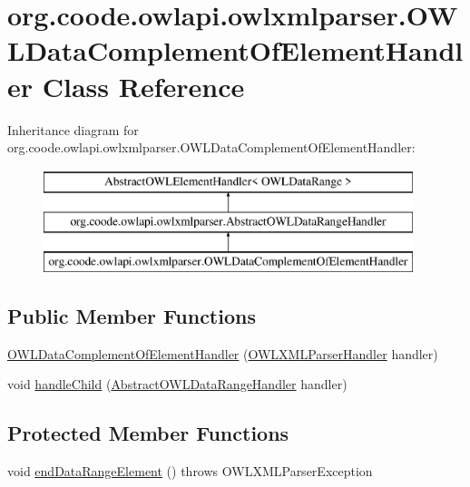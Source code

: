 \hypertarget{classorg_1_1coode_1_1owlapi_1_1owlxmlparser_1_1_o_w_l_data_complement_of_element_handler}{\section{org.\-coode.\-owlapi.\-owlxmlparser.\-O\-W\-L\-Data\-Complement\-Of\-Element\-Handler Class Reference}
\label{classorg_1_1coode_1_1owlapi_1_1owlxmlparser_1_1_o_w_l_data_complement_of_element_handler}
}
Inheritance diagram for org.\-coode.\-owlapi.\-owlxmlparser.\-O\-W\-L\-Data\-Complement\-Of\-Element\-Handler\-:\begin{figure}[H]
\begin{center}
\leavevmode
\includegraphics[height=3.000000cm]{classorg_1_1coode_1_1owlapi_1_1owlxmlparser_1_1_o_w_l_data_complement_of_element_handler}
\end{center}
\end{figure}
\subsection*{Public Member Functions}
\begin{DoxyCompactItemize}
\item 
\hyperlink{classorg_1_1coode_1_1owlapi_1_1owlxmlparser_1_1_o_w_l_data_complement_of_element_handler_a16920beb38d77c42898ebe306a391446}{O\-W\-L\-Data\-Complement\-Of\-Element\-Handler} (\hyperlink{classorg_1_1coode_1_1owlapi_1_1owlxmlparser_1_1_o_w_l_x_m_l_parser_handler}{O\-W\-L\-X\-M\-L\-Parser\-Handler} handler)
\item 
void \hyperlink{classorg_1_1coode_1_1owlapi_1_1owlxmlparser_1_1_o_w_l_data_complement_of_element_handler_a865457cca48896be48ad006e9bdb2315}{handle\-Child} (\hyperlink{classorg_1_1coode_1_1owlapi_1_1owlxmlparser_1_1_abstract_o_w_l_data_range_handler}{Abstract\-O\-W\-L\-Data\-Range\-Handler} handler)
\end{DoxyCompactItemize}
\subsection*{Protected Member Functions}
\begin{DoxyCompactItemize}
\item 
void \hyperlink{classorg_1_1coode_1_1owlapi_1_1owlxmlparser_1_1_o_w_l_data_complement_of_element_handler_aa54c8456a9db2ddf14d09b7452a09a14}{end\-Data\-Range\-Element} ()  throws O\-W\-L\-X\-M\-L\-Parser\-Exception 
\end{DoxyCompactItemize}
